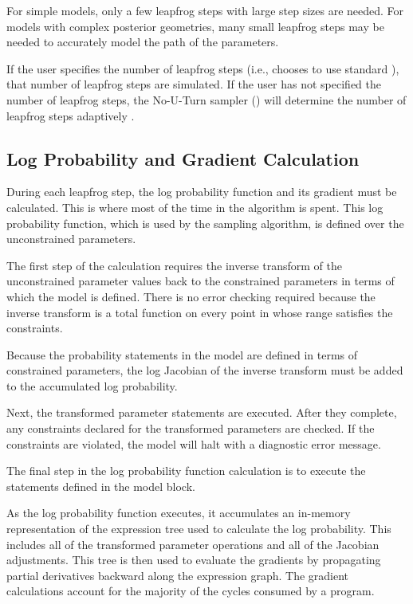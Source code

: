 For simple models, only a few leapfrog steps with large step sizes are
needed.  For models with complex posterior geometries, many small
leapfrog steps may be needed to accurately model the path of the
parameters.

If the user specifies the number of leapfrog steps (i.e., chooses to
use standard \HMC), that number of leapfrog steps are simulated.  If
the user has not specified the number of leapfrog steps, the No-U-Turn
sampler (\NUTS) will determine the number of leapfrog steps adaptively
\citep{Hoffman-Gelman:2011, Hoffman-Gelman:2013}.

\subsection{Log Probability and Gradient Calculation}

During each leapfrog step, the log probability function and its
gradient must be calculated.  This is where most of the time in the
\Stan algorithm is spent.  This log probability function, which is
used by the sampling algorithm, is defined over the unconstrained
parameters.

The first step of the calculation requires the inverse transform of
the unconstrained parameter values back to the constrained parameters
in terms of which the model is defined.  There is no error checking
required because the inverse transform is a total function on every point
in whose range satisfies the constraints.

Because the probability statements in the model are defined in terms
of constrained parameters, the log Jacobian of the inverse transform
must be added to the accumulated log probability.

Next, the transformed parameter statements are executed.  After they
complete, any constraints declared for the transformed parameters are
checked.  If the constraints are violated, the model will halt with a
diagnostic error message.

The final step in the log probability function calculation is to
execute the statements defined in the model block.  

As the log probability function executes, it accumulates an in-memory
representation of the expression tree used to calculate the log
probability.  This includes all of the transformed parameter
operations and all of the Jacobian adjustments.  This tree is then
used to evaluate the gradients by propagating partial derivatives
backward along the expression graph.  The gradient calculations
account for the majority of the cycles consumed by a \Stan program.

